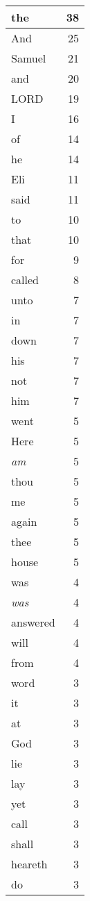\begin{center}
\begin{longtable}{l|r}
\hline \hline
\endlastfoot
the & 38 \\ \hline
And & 25 \\ \hline
Samuel & 21 \\ \hline
and & 20 \\ \hline
LORD & 19 \\ \hline
I & 16 \\ \hline
of & 14 \\ \hline
he & 14 \\ \hline
Eli & 11 \\ \hline
said & 11 \\ \hline
to & 10 \\ \hline
that & 10 \\ \hline
for & 9 \\ \hline
called & 8 \\ \hline
unto & 7 \\ \hline
in & 7 \\ \hline
down & 7 \\ \hline
his & 7 \\ \hline
not & 7 \\ \hline
him & 7 \\ \hline
went & 5 \\ \hline
Here & 5 \\ \hline
\emph{am} & 5 \\ \hline
thou & 5 \\ \hline
me & 5 \\ \hline
again & 5 \\ \hline
thee & 5 \\ \hline
house & 5 \\ \hline
was & 4 \\ \hline
\emph{was} & 4 \\ \hline
answered & 4 \\ \hline
will & 4 \\ \hline
from & 4 \\ \hline
word & 3 \\ \hline
it & 3 \\ \hline
at & 3 \\ \hline
God & 3 \\ \hline
lie & 3 \\ \hline
lay & 3 \\ \hline
yet & 3 \\ \hline
call & 3 \\ \hline
shall & 3 \\ \hline
heareth & 3 \\ \hline
do & 3 \\ \hline

\end{longtable}
\end{center}
